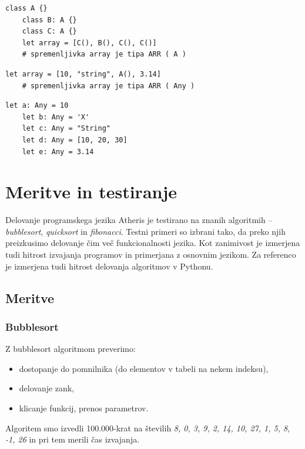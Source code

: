 \documentclass[a4paper, 12p]{book}
\begin{document}
\begin{lstlisting}[caption={Elementi tabele s skupnim nadrazredom.}, captionpos=b]
	class A {}
	class B: A {}
	class C: A {}
	let array = [C(), B(), C(), C()] 
	# spremenljivka array je tipa ARR ( A )
\end{lstlisting}

\begin{lstlisting}[caption={Elementi tabele nimajo skupnega tipa.}, captionpos=b]
	let array = [10, "string", A(), 3.14] 
	# spremenljivka array je tipa ARR ( Any )
\end{lstlisting}

\begin{lstlisting}[caption={Spremenljivkam tipa \textit{Any} lahko priredimo vrednost poljubnega tipa.}, captionpos=b]
	let a: Any = 10
	let b: Any = 'X'
	let c: Any = "String"
	let d: Any = [10, 20, 30]
	let e: Any = 3.14
\end{lstlisting}

\chapter{Meritve in testiranje}

Delovanje programskega jezika Atheris je testirano na znanih algoritmih – \textit{bubblesort}, \textit{quicksort} in \textit{fibonacci}. Testni primeri so izbrani tako, da preko njih preizkusimo delovanje čim več funkcionalnosti jezika. Kot zanimivost je izmerjena tudi hitrost izvajanja programov in primerjana z osnovnim jezikom. Za referenco je izmerjena tudi hitrost delovanja algoritmov v Pythonu.

\newpage

\section{Meritve}

\subsection{Bubblesort}

Z bubblesort algoritmom preverimo:

\begin{itemize}
	\item dostopanje do pomnilnika (do elementov v tabeli na nekem indeksu),
	\item delovanje zank,
	\item klicanje funkcij, prenos parametrov.
\end{itemize}
Algoritem smo izvedli 100.000-krat na številih \textit{8, 0, 3, 9, 2, 14, 10, 27, 1, 5, 8, -1, 26} in pri tem merili čas izvajanja.
\end{document}
